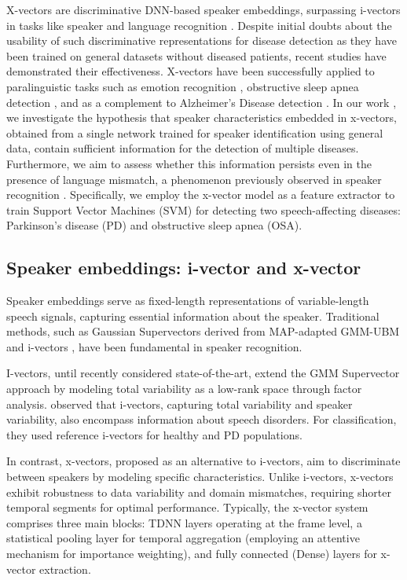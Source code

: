 X-vectors are discriminative DNN-based speaker embeddings, surpassing i-vectors in tasks like speaker and language recognition \cite{snyder2018x}. Despite initial doubts about the usability of such discriminative representations for disease detection as they have been trained on general datasets without diseased patients, recent studies have demonstrated their effectiveness. X-vectors have been successfully applied to paralinguistic tasks such as emotion recognition \cite{pappagari2020x}, obstructive sleep apnea detection \cite{perero2019modeling}, and as a complement to Alzheimer’s Disease detection \cite{zargarbashi2019multi}. In our work \cite{botelho2020pathological}, we investigate the hypothesis that speaker characteristics embedded in x-vectors, obtained from a single network trained for speaker identification using general data, contain sufficient information for the detection of multiple diseases. Furthermore, we aim to assess whether this information persists even in the presence of language mismatch, a phenomenon previously observed in speaker recognition \cite{snyder2017deep}. Specifically, we employ the x-vector model as a feature extractor to train Support Vector Machines (SVM) for detecting two speech-affecting diseases: Parkinson’s disease (PD) and obstructive sleep apnea (OSA).

\subsection{Speaker embeddings: i-vector and x-vector}
Speaker embeddings serve as fixed-length representations of variable-length speech signals, capturing essential information about the speaker. Traditional methods, such as Gaussian Supervectors \cite{kenny2007joint} derived from MAP-adapted GMM-UBM \cite{reynolds2000speaker} and i-vectors \cite{dehak2010front}, have been fundamental in speaker recognition.

I-vectors, until recently considered state-of-the-art, extend the GMM Supervector approach by modeling total variability as a low-rank space through factor analysis. \cite{hauptman2019identifying} observed that i-vectors, capturing total variability and speaker variability, also encompass information about speech disorders. For classification, they used reference i-vectors for healthy and PD populations.

In contrast, x-vectors, proposed as an alternative to i-vectors, aim to discriminate between speakers by modeling specific characteristics. Unlike i-vectors, x-vectors exhibit robustness to data variability and domain mismatches, requiring shorter temporal segments for optimal performance. Typically, the x-vector system comprises three main blocks: TDNN layers operating at the frame level, a statistical pooling layer for temporal aggregation (employing an attentive mechanism for importance weighting), and fully connected (Dense) layers for x-vector extraction.

